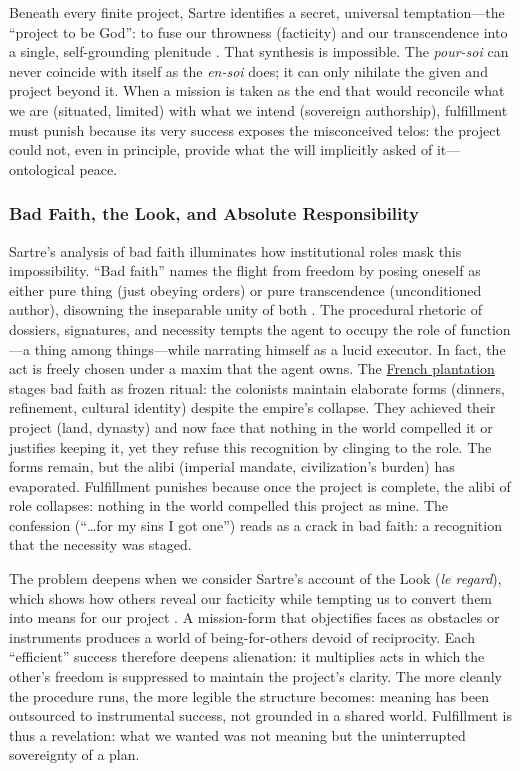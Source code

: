 Beneath every finite project, Sartre identifies a secret, universal temptation—the ``project to
be God'': to fuse our throwness (facticity) and our transcendence into a single, self-grounding
plenitude \parencite[pp.~586--604]{SartreBN2003}. That synthesis is impossible. The
\emph{pour-soi} can never coincide with itself as the \emph{en-soi} does; it can only nihilate
the given and project beyond it. When a mission is taken as the end that would reconcile what
we are (situated, limited) with what we intend (sovereign authorship), fulfillment must punish
because its very success exposes the misconceived telos: the project could not, even in
principle, provide what the will implicitly asked of it—ontological peace.

\subsubsection*{Bad Faith, the Look, and Absolute Responsibility}

Sartre's analysis of bad faith illuminates how institutional roles mask this impossibility.
``Bad faith'' names the flight from freedom by posing oneself as either pure thing (just
obeying orders) or pure transcendence (unconditioned author), disowning the inseparable unity
of both \parencite[pp.~86--116]{SartreBN2003}. The procedural rhetoric of dossiers, signatures,
and necessity tempts the agent to occupy the role of function—a thing among things—while
narrating himself as a lucid executor. In fact, the act is freely chosen under a maxim that the
agent owns. The \hyperref[scene:french-plantation]{French plantation} stages bad faith as
frozen ritual: the colonists maintain elaborate forms (dinners, refinement, cultural identity)
despite the empire's collapse. They achieved their project (land, dynasty) and now face that
nothing in the world compelled it or justifies keeping it, yet they refuse this recognition by
clinging to the role. The forms remain, but the alibi (imperial mandate, civilization's burden)
has evaporated. Fulfillment punishes because once the project is complete, the alibi of role
collapses: nothing in the world compelled this project as mine. The confession (``\ldots for my
sins I got one'') reads as a crack in bad faith: a recognition that the necessity was staged.

The problem deepens when we consider Sartre's account of the Look (\emph{le regard}), which
shows how others reveal our facticity while tempting us to convert them into means for our
project \parencite[pp.~252--302]{SartreBN2003}. A mission-form that objectifies faces as
obstacles or instruments produces a world of being-for-others devoid of reciprocity. Each
``efficient'' success therefore deepens alienation: it multiplies acts in which the other's
freedom is suppressed to maintain the project's clarity. The more cleanly the procedure runs,
the more legible the structure becomes: meaning has been outsourced to instrumental success,
not grounded in a shared world. Fulfillment is thus a revelation: what we wanted was not meaning
but the uninterrupted sovereignty of a plan.

